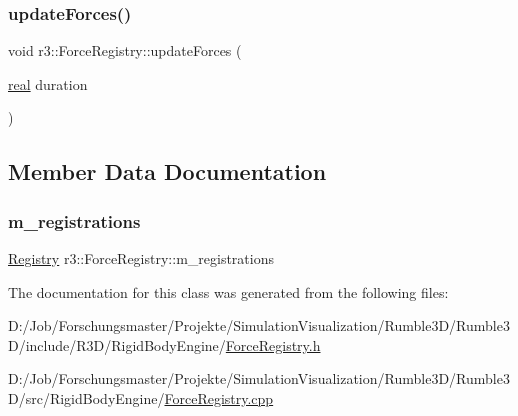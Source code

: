 \mbox{\label{classr3_1_1_force_registry_a34d6ad7472e2f47dfd3416a703eca78e}} 
\subsubsection{\texorpdfstring{update\+Forces()}{updateForces()}}
{\footnotesize\ttfamily void r3\+::\+Force\+Registry\+::update\+Forces (\begin{DoxyParamCaption}\item[{\mbox{\hyperlink{namespacer3_ab2016b3e3f743fb735afce242f0dc1eb}{real}}}]{duration }\end{DoxyParamCaption})}



\subsection{Member Data Documentation}
\mbox{\label{classr3_1_1_force_registry_a36847da26301dc4b18e6b6b25fb2fa51}} 
\subsubsection{\texorpdfstring{m\+\_\+registrations}{m\_registrations}}
{\footnotesize\ttfamily \mbox{\hyperlink{classr3_1_1_force_registry_a91449a71b1a33d773ef787ae56ae9b2d}{Registry}} r3\+::\+Force\+Registry\+::m\+\_\+registrations\hspace{0.3cm}{\ttfamily [protected]}}



The documentation for this class was generated from the following files\+:\begin{DoxyCompactItemize}
\item 
D\+:/\+Job/\+Forschungsmaster/\+Projekte/\+Simulation\+Visualization/\+Rumble3\+D/\+Rumble3\+D/include/\+R3\+D/\+Rigid\+Body\+Engine/\mbox{\hyperlink{_force_registry_8h}{Force\+Registry.\+h}}\item 
D\+:/\+Job/\+Forschungsmaster/\+Projekte/\+Simulation\+Visualization/\+Rumble3\+D/\+Rumble3\+D/src/\+Rigid\+Body\+Engine/\mbox{\hyperlink{_force_registry_8cpp}{Force\+Registry.\+cpp}}\end{DoxyCompactItemize}
